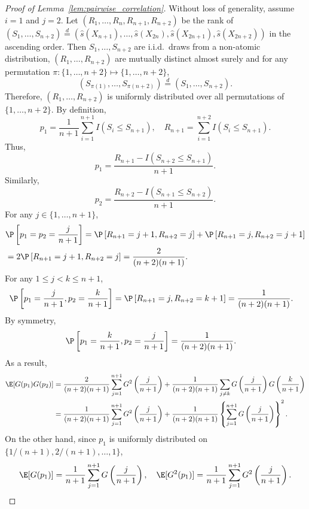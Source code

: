 \begin{proof}[Proof of Lemma~\ref{lem:pairwise_correlation}]
Without loss of generality, assume $i = 1$ and $j = 2$. Let $(R_1, \ldots, R_n, R_{n+1}, R_{n+2})$ be the rank of $(S_{1}, \ldots, S_{n+2})\stackrel{d}{=}(\hat{s}(X_{n+1}), \ldots, \hat{s}(X_{2n}), \hat{s}(X_{2n+1}), \hat{s}(X_{2n+2}))$ in the ascending order. Then $S_1, \ldots, S_{n+2}$ are i.i.d.~draws from a non-atomic distribution, $(R_1, \ldots, R_{n+2})$ are mutually distinct almost surely and for any permutation $\pi: \{1, \ldots, n+2\}\mapsto \{1, \ldots, n+2\}$,
\[(S_{\pi(1)}, \ldots, S_{\pi(n+2)})\stackrel{d}{=}(S_1, \ldots, S_{n+2}).\]
Therefore, $(R_1, \ldots, R_{n+2})$ is uniformly distributed over all permutations of $\{1, \ldots, n + 2\}$.
By definition,
\[p_1 = \frac{1}{n+1}\sum_{i=1}^{n+1}I(S_i \le S_{n+1}), \quad R_{n+1} = \sum_{i=1}^{n+2}I(S_i \le S_{n+1}).\]
Thus,
\[p_1 = \frac{R_{n+1} - I(S_{n+2}\le S_{n+1})}{n+1}.\]
Similarly,
\[p_2 = \frac{R_{n+2} - I(S_{n+1}\le S_{n+2})}{n+1}.\]
For any $j\in \{1, \ldots, n+1\}$,
\begin{align*}
&\P\left[p_1 = p_2 = \frac{j}{n+1}\right] = \P\left[ R_{n+1} = j+1, R_{n+2} = j\right]+ \P\left[ R_{n+1} = j, R_{n+2} = j+1\right]  \\
& = 2\P\left[ R_{n+1} = j+1, R_{n+2} = j \right] = \frac{2}{(n+2)(n+1)}.
\end{align*}
For any $1 \le j < k\le n+1$,
\begin{align*}
&\P\left[ p_1 = \frac{j}{n+1}, p_2 = \frac{k}{n+1}\right] = \P\left[ R_{n+1} = j, R_{n+2} = k + 1 \right] = \frac{1}{(n+2)(n+1)}.
\end{align*}
By symmetry,
\begin{align*}
&\P\left[ p_1 = \frac{k}{n+1}, p_2 = \frac{j}{n+1} \right] = \frac{1}{(n+2)(n+1)}.
\end{align*}
As a result,
\begin{align*}
\E[G(p_1)G(p_2)] &= \frac{2}{(n+2)(n+1)}\sum_{j=1}^{n+1}G^2\left(\frac{j}{n+1}\right) + \frac{1}{(n+2)(n+1)}\sum_{j\not=k}G\left(\frac{j}{n+1}\right)G\left(\frac{k}{n+1}\right)\\
& = \frac{1}{(n+2)(n+1)}\sum_{j=1}^{n+1}G^2\left(\frac{j}{n+1}\right) + \frac{1}{(n+2)(n+1)}\left\{\sum_{j=1}^{n+1}G\left(\frac{j}{n+1}\right)\right\}^2.
\end{align*}
On the other hand, since $p_1$ is uniformly distributed on $\{1 / (n+1), 2 / (n + 1), \ldots, 1\}$,
\[\E[G(p_1)] = \frac{1}{n+1}\sum_{j=1}^{n+1}G\left(\frac{j}{n+1}\right), \quad \E[G^2(p_1)] = \frac{1}{n+1}\sum_{j=1}^{n+1}G^2\left(\frac{j}{n+1}\right).\]

\end{proof}

